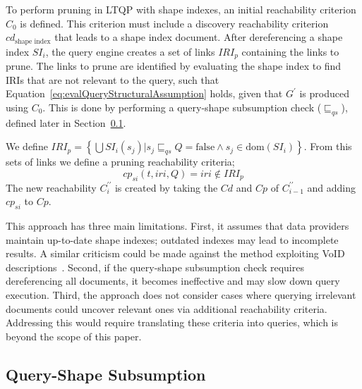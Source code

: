 To perform pruning in LTQP with shape indexes, an initial reachability criterion $C_0$ is defined.
This criterion must include a discovery reachability criterion $cd_{\text{shape index}}$ that leads to a shape index document.  
After dereferencing a shape index $SI_i$, the query engine creates a set of links $IRI_p$ containing the links to prune.  
The links to prune are identified by evaluating the shape index to find IRIs that are not relevant to the query, such that Equation~\ref{eq:evalQueryStructuralAssumption} holds, given that $G^{\prime}$ is produced using $C_0$.  
This is done by performing a query-shape subsumption check ($\sqsubseteq_{qs}$), defined later in Section~\ref{sec:containment}.

We define
$IRI_p = \left\{ \bigcup SI_i(s_j) | s_j \sqsubseteq_{qs}  Q = \mathrm{false} \land s_j \in \text{dom}(SI_i) \right\}$.
From this sets of links we define a pruning reachability criteria;
\begin{equation}
       cp_{si}(t, iri, Q) = iri \notin IRI_p
\end{equation}
The new reachability $C^{\prime\prime}_i$ is created by taking the $Cd$ and $Cp$ of $C^{\prime\prime}_{i-1}$ and adding $cp_{si}$ to $Cp$.

This approach has three main limitations.  
First, it assumes that data providers maintain up-to-date shape indexes; outdated indexes may lead to incomplete results.
A similar criticism could be made against the method exploiting VoID descriptions~\cite{Montoya2017}.
Second, if the query-shape subsumption check requires dereferencing all documents, it becomes ineffective and may slow down query execution.  
Third, the approach does not consider cases where querying irrelevant documents could uncover relevant ones via additional reachability criteria.  
Addressing this would require translating these criteria into queries, which is beyond the scope of this paper.

\subsection{Query-Shape Subsumption}\label{sec:containment}

